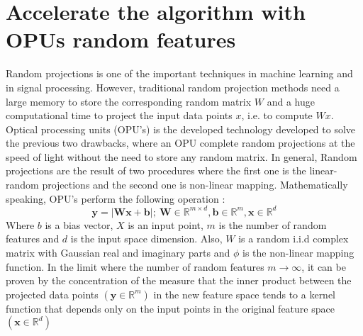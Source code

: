 \section{Accelerate the algorithm with OPUs random features}
\label{section:OPU}
Random projections is one of the important techniques in machine learning and in signal processing. However, traditional random projection methods need a large memory to store the corresponding random matrix $W$ and a huge computational time to project the input data points $x$, i.e. to compute $Wx$. Optical processing units (OPU's) is the developed technology developed to solve the previous two drawbacks, where an OPU complete random projections at the speed of light without the need to store any random matrix. In general, Random projections are the result of two procedures where the first one is the linear-random projections and the second one is non-linear mapping.
Mathematically speaking, OPU's perform the following operation \citep{saade_opu}:
\begin{equation}
\label{OPU_equation}
\mathbf{y}=|\mathbf{Wx+b}|;~\mathbf{W}\in \mathbb{R}^{m\times d},\mathbf{b}\in \mathbb{R}^m, \mathbf{x}\in \mathbb{R}^d
\end{equation}
Where $b$ is a bias vector, $X$ is an input point, $m$ is the number of random features and $d$ is the input space dimension. Also, $W$ is a random i.i.d complex matrix with Gaussian real and imaginary parts and $\phi$ is the non-linear mapping function.\newline
In the limit where the number of random features $m\xrightarrow{}\infty$, it can be proven by the concentration of the measure that the inner product between the projected data points $(\mathbf{y}\in \mathbb{R}^m)$ in the new feature space tends to a kernel function that depends only on the input points in the original feature space $(\mathbf{x}\in \mathbb{R}^d)$

